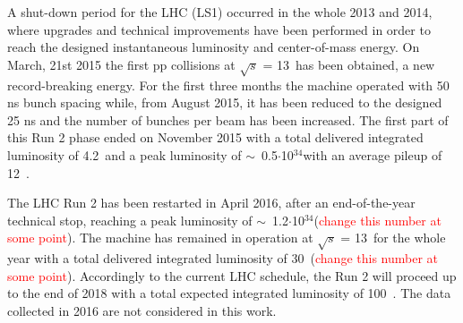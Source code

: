 A shut-down period for the LHC (LS1) occurred in the whole 2013 and 2014, where upgrades and technical improvements have been performed in order to reach the designed instantaneous luminosity and center-of-mass energy. On March, 21st 2015 the first pp collisions at $\sqrt{s}$ = 13~\TeV has been obtained, a new record-breaking energy. For the first three months the machine operated with 50 ns bunch spacing while, from August 2015, it has been reduced to the designed 25 ns and the number of bunches per beam has been increased. The first part of this Run 2 phase ended on November 2015 with a total delivered integrated luminosity of 4.2~\fbinv and a peak luminosity of $\sim$~0.5$\cdot$10$^{34}$\percms with an average pileup of 12~\cite{LumiPublicResults}.

The LHC Run 2 has been restarted in April 2016, after an end-of-the-year technical stop, reaching a peak luminosity of $\sim$~1.2$\cdot$10$^{34}$\percms (\textcolor{red}{change this number at some point}). The machine has remained in operation at $\sqrt{s}$ = 13~\TeV for the whole year with a total delivered integrated luminosity of 30~\fbinv (\textcolor{red}{change this number at some point}). Accordingly to the current LHC schedule, the Run 2 will proceed up to the end of 2018 with a total expected integrated luminosity of 100~\fbinv. The data collected in 2016 are not considered in this work.




